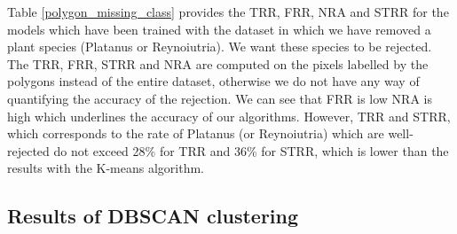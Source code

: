 \documentclass{siamart171218}
\begin{document}

Table \ref{polygon_missing_class} provides the TRR, FRR, NRA and STRR for the models which have been trained with the dataset in which we have removed a plant species (Platanus or Reynoiutria). We want these species to be rejected. The TRR, FRR, STRR and NRA are computed on the pixels labelled by the polygons instead of the entire dataset, otherwise we do not have any way of quantifying the accuracy of the rejection. We can see that FRR is low NRA is high which underlines the accuracy of our algorithms.  However, TRR and STRR, which corresponds to the rate of Platanus (or Reynoiutria) which are well-rejected do not exceed 28\% for TRR and 36\% for STRR, which is lower than the results with the K-means algorithm. 

\subsection{Results of DBSCAN clustering}
\end{document}
